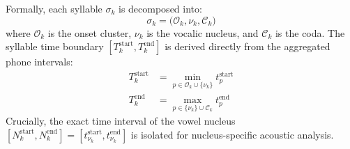 \documentclass[10pt,conference]{IEEEtran}
\begin{document}
Formally, each syllable $\sigma_k$ is decomposed into:
\begin{equation}
\sigma_k = \big( \mathcal{O}_k, \nu_k, \mathcal{C}_k \big)
\end{equation}
where $\mathcal{O}_k$ is the onset cluster, $\nu_k$ is the vocalic nucleus, and $\mathcal{C}_k$ is the coda. The syllable time boundary $[T_k^{\text{start}}, T_k^{\text{end}}]$ is derived directly from the aggregated phone intervals:
\begin{align}
T_k^{\text{start}} &= \min_{p \in \mathcal{O}_k \cup \{\nu_k\}} t_p^{\text{start}} \\
T_k^{\text{end}} &= \max_{p \in \{\nu_k\} \cup \mathcal{C}_k} t_p^{\text{end}}
\end{align}
Crucially, the exact time interval of the vowel nucleus $[N_k^{\text{start}}, N_k^{\text{end}}] = [t_{\nu_k}^{\text{start}}, t_{\nu_k}^{\text{end}}]$ is isolated for nucleus-specific acoustic analysis.
\end{document}
